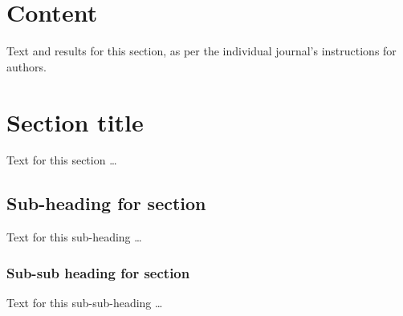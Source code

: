\documentclass{bmcart}
\begin{document}


\section*{Content}
Text and results for this section, as per the individual journal's instructions for authors. %

\section*{Section title}
Text for this section \ldots
\subsection*{Sub-heading for section}
Text for this sub-heading \ldots
\subsubsection*{Sub-sub heading for section}
Text for this sub-sub-heading \ldots
\end{document}
